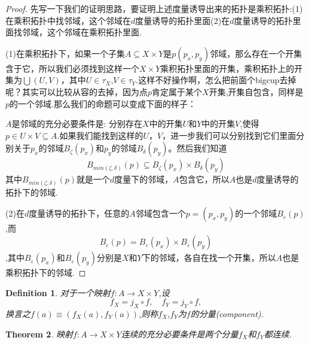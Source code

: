 \documentclass{article}
\newtheorem{theorem}{Theorem}[section]
\newtheorem{definition}[theorem]{Definition}
\newcommand*{\xfunc}[4]{{#2}\colon{#3}{#1}{#4}}
\newcommand*{\func}[3]{\xfunc{\to}{#1}{#2}{#3}}
\begin{document}
\begin{proof}
先写一下我们的证明思路，要证明上述度量诱导出来的拓扑是乘积拓扑:(1)在乘积拓扑中找邻域，这个邻域在$d$度量诱导的拓扑里面(2)在$d$度量诱导的拓扑里面找邻域，这个邻域在乘积拓扑里面.

(1)在乘积拓扑下，如果一个子集$A \subseteq X \times Y$是$p(p_x,p_y)$邻域，那么存在一个开集含于它，所以我们必须找到这样一个$X \times Y$乘积拓扑里面的开集，乘积拓扑上的开集为$\bigcup(U,V)$，其中$U \in \tau_X$,$V \in \tau_Y$.这样不好操作啊，怎么把前面个bigcup去掉呢？其实可以比较从容的去掉，因为点$p$肯定属于某个$X$开集,开集自包含，同样是$p$的一个邻域.那么我们的命题可以变成下面的样子：

$A$是邻域的充分必要条件是: 分别存在$X$中的开集$U$和$Y$中的开集$V$,使得$p \in U \times V \subseteq A$.如果我们能找到这样的$U$，$V$，进一步我们可以分别找到它们里面分别关于$p_x$的邻域$B_\zeta(p_x)$和$p_y$的邻域$B_\delta(p_y)$。然后我们知道\[B_{min(\zeta,\delta)}(p) \subseteq B_\zeta(p_x) \times B_\delta(p_y)\]其中$B_{min(\zeta,\delta)}(p)$就是一个$d$度量下的邻域，$A$包含它，所以$A$也是$d$度量诱导的拓扑下的邻域.

(2)在$d$度量诱导的拓扑下，任意的$A$邻域包含一个$p=(p_x,p_y)$的一个邻域$B_\varepsilon(p)$,而\[B_\varepsilon(p)=B_\varepsilon(p_x) \times B_\varepsilon(p_y)\],其中$B_\varepsilon(p_x)$和$B_\varepsilon(p_y)$分别是$X$和$Y$下的邻域，各自在找一个开集，所以$A$也是乘积拓扑下的邻域.
\end{proof}


\begin{definition}
对于一个映射$\func{f}{A}{X \times Y}$,设\[f_X = j_X \circ f, \quad f_Y = j_Y \circ f,\]换言之$f(a) \equiv (f_X(a),f_Y(a))$,则称$f_X$,$f_Y$为$f$的分量(component).
\end{definition}

\begin{theorem}
映射$\func{f}{A}{X \times Y}$连续的充分必要条件是两个分量$f_X$和$f_Y$都连续.
\begin{center}
\end{center}
\end{theorem}
\end{document}
